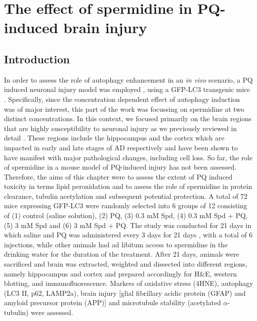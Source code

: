 \chapter{The effect of spermidine in PQ-induced brain injury}
\label{sec:chapter7}
\section{Introduction}
In order to assess the role of autophagy enhancement in an \textit{in vivo} scenario, a PQ induced neuronal injury model was employed \citep{Chen2012}, using a GFP-LC3 transgenic mice \citep{Mizushima2004a}. Specifically, since the concentration dependent effect of autophagy induction was of major interest, this part of the work was focussing on spermidine at two distinct concentrations. In this context, we focused primarily on the brain regions that are highly susceptibility to neuronal injury as we previously reviewed in detail \citep{lumkwana2017}. These regions include the hippocampus and the cortex which are impacted in early and late stages of AD respectively and have been shown to have manifest with major pathological changes, including cell loss. So far, the role of spermidine in a mouse model of PQ-induced injury has not been assessed. Therefore, the aims of this chapter were to assess the extent of PQ induced toxicity in terms lipid peroxidation and to assess the role of spermidine in protein clearance, tubulin acetylation and subsequent potential protection. A total of 72 mice expressing GFP-LC3 were randomly selected into 6 groups of 12 consisting of (1) control (saline solution), (2) PQ, (3) 0.3 mM Spd, (4) 0.3 mM Spd + PQ, (5) 3 mM Spd and (6) 3 mM Spd + PQ. The study was conducted for 21 days in which saline and PQ was administered every 3 days for 21 days \citep{Chen2012}, with a total of 6 injections, while other animals had ad libitum access to spermidine in the drinking water for the duration of the treatment. After 21 days, animals were sacrificed and brain was extracted, weighted and dissected into different regions, namely hippocampus and cortex and prepared accordingly for H\&E, western blotting, and immunofluorescence. Markers of oxidative stress (4HNE), autophagy (LC3 II, p62, LAMP2a), brain injury [glial fibrillary acidic protein (GFAP) and amyloid precursor protein (APP)] and microtubule stability (acetylated $\alpha$-tubulin) were assessed. 


